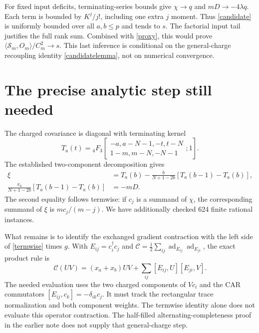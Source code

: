 \documentclass[11pt,a4paper]{article}
\begin{document}
For fixed input deficits, terminating-series bounds give
$\chi\to q$ and $mD\to-4\lambda q$. Each term is bounded by
$K^j/j!$, including one extra $j$ moment. Thus \eqref{candidate}
is uniformly bounded over all $a,b\le p$ and tends to $s$.
The factorial input tail justifies the full rank sum. Combined
with \eqref{proxy}, this would prove
$\langle\mathcal S_m,O_m\rangle/C_m^2\to s$.
This last inference is conditional on the general-charge
recoupling identity \eqref{candidatelemma}, not on numerical convergence.

\newpage
\section{The precise analytic step still needed}
The charged covariance is diagonal with terminating kernel
\begin{equation}
 T_a(t)={}_4F_3\!\left[\begin{matrix}-a,a-N-1,-t,t-N\\
 1-m,m-N,-N-1\end{matrix};1\right].
\end{equation}
The established two-component decomposition gives
\begin{align}
 \xi&=T_a(b)-\frac b{N+1-2b}[T_a(b-1)-T_a(b)],\\
 \frac{x_b}{N+1-2b}[T_a(b-1)-T_a(b)]&=-mD.\label{termwise}
\end{align}
The second equality follows termwise: if $c_j$ is a summand of
$\chi$, the corresponding summand of $\xi$ is $mc_j/(m-j)$.
We have additionally checked 624 finite rational instances.

What remains is to identify the exchanged gradient contraction
with the left side of \eqref{termwise} times $g$. With
$E_{ij}=c_i^\dagger c_j$ and
$\mathcal C=\frac12\sum_{ij}\operatorname{ad}_{E_{ij}}
\operatorname{ad}_{E_{ji}}$, the exact product rule is
\begin{equation}
 \mathcal C(UV)=(x_a+x_b)UV+
          \sum_{ij}[E_{ij},U][E_{ji},V].
\end{equation}
The needed evaluation uses the two charged components of $Vc_i$
and the CAR commutators $[E_{ij},c_k]=-\delta_{ik}c_j$.
It must track the rectangular trace normalization and both
component weights. The termwise identity alone does not evaluate
this operator contraction. The half-filled alternating-completeness
proof in the earlier note does not supply that general-charge step.
\end{document}

